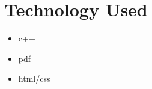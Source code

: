 \documentclass[12pt]{article}
\begin{document}
\section{Technology Used}
\begin{itemize}
	\item c++ 
	\item pdf
	\item html/css
\end{itemize}
%
%
%
%
%
%
%
\end{document}

